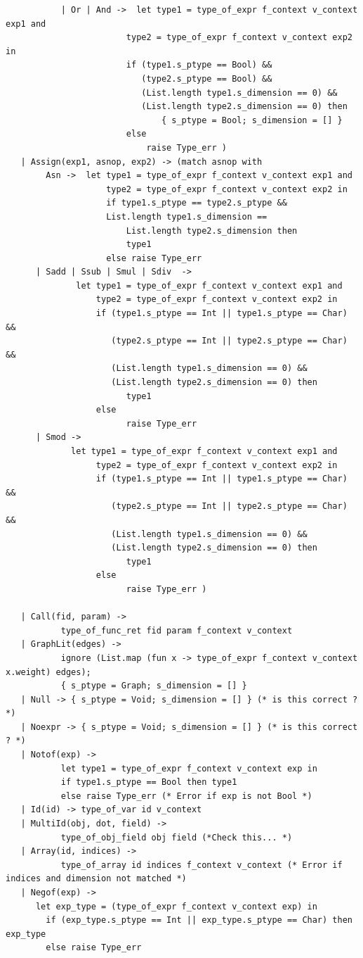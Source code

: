 \documentclass[a4paper,12pt]{article}
\begin{document}
\begin{lstlisting}
           | Or | And ->  let type1 = type_of_expr f_context v_context exp1 and 
                        type2 = type_of_expr f_context v_context exp2 in
                        if (type1.s_ptype == Bool) &&
                           (type2.s_ptype == Bool) &&
                           (List.length type1.s_dimension == 0) && 
                           (List.length type2.s_dimension == 0) then
                               { s_ptype = Bool; s_dimension = [] }
                        else
                            raise Type_err )
   | Assign(exp1, asnop, exp2) -> (match asnop with
        Asn ->  let type1 = type_of_expr f_context v_context exp1 and 
                    type2 = type_of_expr f_context v_context exp2 in
                    if type1.s_ptype == type2.s_ptype && 
                    List.length type1.s_dimension == 
                        List.length type2.s_dimension then
                        type1
                    else raise Type_err
      | Sadd | Ssub | Smul | Sdiv  ->
              let type1 = type_of_expr f_context v_context exp1 and 
                  type2 = type_of_expr f_context v_context exp2 in
                  if (type1.s_ptype == Int || type1.s_ptype == Char) &&
                     (type2.s_ptype == Int || type2.s_ptype == Char) &&
                     (List.length type1.s_dimension == 0) && 
                     (List.length type2.s_dimension == 0) then
                        type1
                  else
                        raise Type_err
      | Smod ->
             let type1 = type_of_expr f_context v_context exp1 and 
                  type2 = type_of_expr f_context v_context exp2 in
                  if (type1.s_ptype == Int || type1.s_ptype == Char) &&
                     (type2.s_ptype == Int || type2.s_ptype == Char) &&
                     (List.length type1.s_dimension == 0) && 
                     (List.length type2.s_dimension == 0) then
                        type1
                  else
                        raise Type_err )

   | Call(fid, param) -> 
           type_of_func_ret fid param f_context v_context 
   | GraphLit(edges) ->  
           ignore (List.map (fun x -> type_of_expr f_context v_context x.weight) edges); 
           { s_ptype = Graph; s_dimension = [] }
   | Null -> { s_ptype = Void; s_dimension = [] } (* is this correct ? *)
   | Noexpr -> { s_ptype = Void; s_dimension = [] } (* is this correct ? *)
   | Notof(exp) -> 
           let type1 = type_of_expr f_context v_context exp in
           if type1.s_ptype == Bool then type1
           else raise Type_err (* Error if exp is not Bool *)
   | Id(id) -> type_of_var id v_context
   | MultiId(obj, dot, field) -> 
           type_of_obj_field obj field (*Check this... *)
   | Array(id, indices) -> 
           type_of_array id indices f_context v_context (* Error if indices and dimension not matched *)
   | Negof(exp) ->
      let exp_type = (type_of_expr f_context v_context exp) in
        if (exp_type.s_ptype == Int || exp_type.s_ptype == Char) then exp_type
        else raise Type_err


\end{lstlisting}
\end{document}
